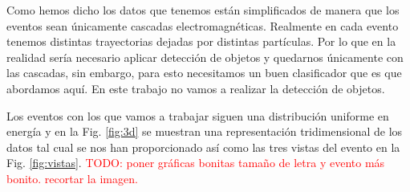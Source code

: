 \documentclass[a4paper,12pt,twoside,titlepage]{article}
\newcommand{\red}[1]{\textcolor{red}{#1}}
\begin{document}
Como hemos dicho los datos que tenemos están simplificados de manera que los eventos sean únicamente cascadas electromagnéticas. Realmente en cada evento tenemos distintas trayectorias dejadas por distintas partículas. Por lo que en la realidad sería necesario aplicar detección de objetos y quedarnos únicamente con las cascadas, sin embargo, para esto necesitamos un buen clasificador que es que abordamos aquí. En este trabajo no vamos a realizar la detección de objetos. 

Los eventos con los que vamos a trabajar siguen una distribución uniforme en energía y en la Fig. \ref{fig:3d} se muestran una representación tridimensional de los datos tal cual se nos han proporcionado así como las tres vistas del evento en la Fig. \ref{fig:vistas}. \red{TODO: poner gráficas bonitas tamaño de letra y evento más bonito. recortar la imagen.}
\end{document}
